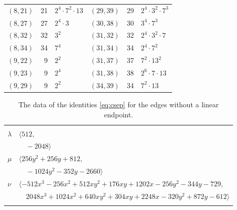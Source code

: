 \documentclass[11pt]{article}
\begin{document}
\begin{longtable}{@{}lrl@{\qquad}lrl@{}}
$(8,21)$ & 21 & $2^{4}\cdot 7^{2}\cdot 13$ & $(29,39)$ & 29 & $2^{4}\cdot 3^{2}\cdot 7^{3}$\\
$(8,27)$ & 27 & $2^{4}\cdot 3$ & $(30,38)$ & 30 & $3^{4}\cdot 7^{3}$\\
$(8,32)$ & 32 & $3^{2}$ & $(31,32)$ & 32 & $2^{4}\cdot 3^{2}\cdot 7$\\
$(8,34)$ & 34 & $7^{4}$ & $(31,34)$ & 34 & $2^{4}\cdot 7^{2}$\\
$(9,22)$ & 9 & $2^{2}$ & $(31,37)$ & 37 & $7^{2}\cdot 13^{2}$\\
$(9,23)$ & 9 & $2^{4}$ & $(31,38)$ & 38 & $2^{6}\cdot 7\cdot 13$\\
$(9,29)$ & 9 & $2^{2}$ & $(34,39)$ & 34 & $7^{2}\cdot 13$\\
\end{longtable}
\endgroup

\begingroup\scriptsize
\setlength{\LTcapwidth}{\textwidth}
\begin{longtable}{@{}ll@{}}
\caption{The data of the identities \eqref{eq:csep} for the edges without a linear endpoint.}\label{tab:cbez}\\
\hline\endfirsthead\hline\endhead\hline\endfoot
\multicolumn{2}{@{}l}{$(i,j)=(8,31)$, $D_{ij}=\langle 1029,0\rangle$}\\
$\lambda$ & $\langle 512,$\\
 & $\quad -2048\rangle$\\
$\mu$ & $\langle 256y^{2}+256y+812,$\\
 & $\quad -1024y^{2}-352y-2660\rangle$\\
$\nu$ & $\langle -512x^{3}-256x^{2}+512xy^{2}+176xy+1202x-256y^{2}-344y-729,$\\
 & $\quad 2048x^{3}+1024x^{2}+640xy^{2}+304xy+2248x-320y^{2}+872y-612\rangle$\\
\addlinespace[2pt]
\end{longtable}
\endgroup
\end{document}
